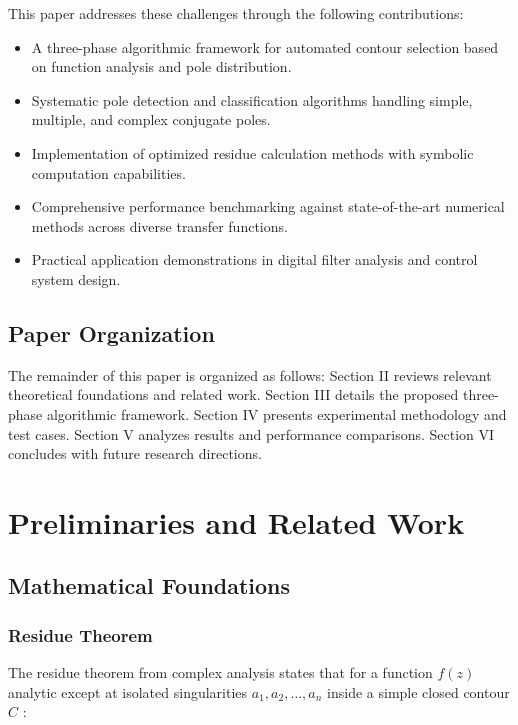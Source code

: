 \documentclass[conference]{IEEEtran}
\begin{document}
This paper addresses these challenges through the following contributions:

\begin{itemize}
    \item A three-phase algorithmic framework for automated contour selection based on function analysis and pole distribution.
    \item Systematic pole detection and classification algorithms handling simple, multiple, and complex conjugate poles.
    \item Implementation of optimized residue calculation methods with symbolic computation capabilities.
    \item Comprehensive performance benchmarking against state-of-the-art numerical methods across diverse transfer functions.
    \item Practical application demonstrations in digital filter analysis and control system design.
\end{itemize}

\subsection{Paper Organization}

The remainder of this paper is organized as follows: Section II reviews relevant theoretical foundations and related work. Section III details the proposed three-phase algorithmic framework. Section IV presents experimental methodology and test cases. Section V analyzes results and performance comparisons. Section VI concludes with future research directions.

\section{Preliminaries and Related Work}

\subsection{Mathematical Foundations}

\subsubsection{Residue Theorem}

The residue theorem from complex analysis states that for a function $f(z)$ analytic except at isolated singularities $a_1, a_2, \ldots, a_n$ inside a simple closed contour $C$ \cite{ahlfors1979}:
\end{document}
